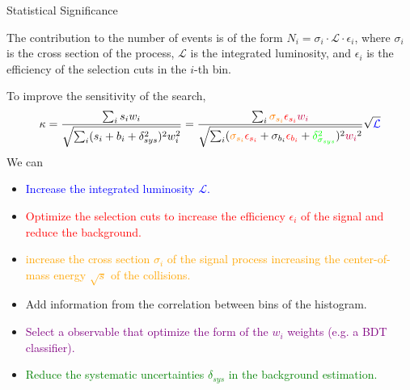 \documentclass{../../bredelebeamer}
\begin{document}
\begin{frame}{Statistical Significance}
    

    The contribution to the number of events is of the form $N_i = \sigma_i \cdot \mathcal{L} \cdot \epsilon_i$, where $\sigma_i$ is the cross section of the process, $\mathcal{L}$ is the integrated luminosity, and $\epsilon_i$ is the efficiency of the selection cuts in the $i$-th bin.

    To improve the sensitivity of the search, 
    \begin{equation}
        \kappa = \frac{\sum_i s_i w_i}{\sqrt{\sum_i (s_i + b_i + \delta_{sys}^2)^2 w_i^2}}
        =\frac{\sum_i \textcolor{orange}{\sigma_{s_i}} \textcolor{red}{\epsilon_{s_i}} \textcolor{purple}{w_i}}{\sqrt{\sum_i (\textcolor{orange}{\sigma_{s_i}}\textcolor{red}{\epsilon_{s_i}} + \sigma_{b_i}\textcolor{red}{\epsilon_{b_i}} + \textcolor{green}{\delta_{\sigma_{sys}}^2})^2 \textcolor{purple}{w_i}^2}}\sqrt{\textcolor{blue}{\mathcal L}}
    \end{equation}
    We can
    \begin{itemize}
        \item \textcolor{blue}{Increase the integrated luminosity $\mathcal{L}$.}
        \item \textcolor{red}{Optimize the selection cuts to increase the efficiency $\epsilon_i$ of the signal and reduce the background.}
        \item \textcolor{orange}{increase the cross section $\sigma_i$ of the signal process increasing the center-of-mass energy $\sqrt{s}$ of the collisions.}
        \item Add information from the correlation between bins of the histogram.
        \item \textcolor{purple}{Select a observable that optimize the form of the $w_i$ weights (e.g. a BDT classifier).}
        \item \textcolor{green}{Reduce the systematic uncertainties $\delta_{sys}$ in the background estimation.}
    \end{itemize}
    
\end{frame}
\end{document}
